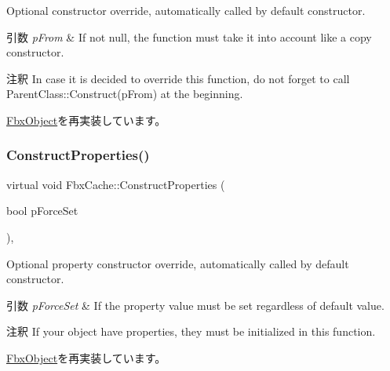 Optional constructor override, automatically called by default constructor. 
\begin{DoxyParams}{引数}
{\em p\+From} & If not null, the function must take it into account like a copy constructor. \\
\hline
\end{DoxyParams}
\begin{DoxyRemark}{注釈}
In case it is decided to override this function, do not forget to call Parent\+Class\+::\+Construct(p\+From) at the beginning. 
\end{DoxyRemark}


\hyperlink{class_fbx_object_a313503bc645af3fdceb4a99ef5cea7eb}{Fbx\+Object}を再実装しています。

\mbox{\label{class_fbx_cache_af5858468e7fe97ab7731ade2bc99ff78}} 
\subsubsection{\texorpdfstring{Construct\+Properties()}{ConstructProperties()}}
{\footnotesize\ttfamily virtual void Fbx\+Cache\+::\+Construct\+Properties (\begin{DoxyParamCaption}\item[{bool}]{p\+Force\+Set }\end{DoxyParamCaption})\hspace{0.3cm}{\ttfamily [protected]}, {\ttfamily [virtual]}}

Optional property constructor override, automatically called by default constructor. 
\begin{DoxyParams}{引数}
{\em p\+Force\+Set} & If the property value must be set regardless of default value. \\
\hline
\end{DoxyParams}
\begin{DoxyRemark}{注釈}
If your object have properties, they must be initialized in this function. 
\end{DoxyRemark}


\hyperlink{class_fbx_object_ad44f814323dc1b5e78bff1bfc608b4bb}{Fbx\+Object}を再実装しています。

\mbox{\label{class_fbx_cache_a2710bc7d786f60e90d54c192c02af938}} 
